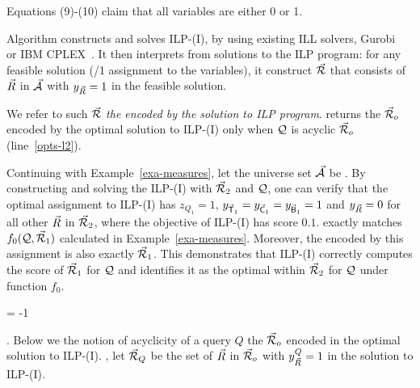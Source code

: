 \vspace{0.6ex}
Equations (9)-(10) claim that all variables are either 0 or 1.


\vspace{1.6ex}
Algorithm \opts constructs and solves ILP-(I), 
by using existing ILL solvers, \eg Gurobi~\cite{gurobi} or
IBM CPLEX~\cite{cplex}.
%
It then interprets \bdss from solutions to the ILP
program: for any feasible solution (/1 assignment to the
variables), it construct \bds $\vec{{\mathcal R}}$ that consists of \bss
$\vec{R}$ in $\vec{{\mathcal A}}$ with $y_{\vec{R}}  = 1$ in the feasible
solution.

We refer to such $\vec{{\mathcal R}}$ 
{\em the \bds encoded by the
solution to ILP program}. \opts returns the \bds
$\vec{{\mathcal R}}_{o}$ encoded by the optimal solution to ILP-(I) only
when $\mathcal Q$ is acyclic \wrt $\vec{{\mathcal R}}_{o}$ (line~\ref{opts-l2}).


\begin{example}\label{exa-ILP-I}
Continuing with Example~\ref{exa-measures},
let the universe set $\vec{{\mathcal A}}$ be .
By constructing and solving the ILP-(I) with $\vec{{\mathcal R}}_{2}$ and $\mathcal Q$,
one can verify that the optimal assignment to ILP-(I) has
$z_{Q_{1}} = 1$, $y_{\vec{\protect\mathsf{T}}_{1}} = y_{\vec{\protect\mathsf{C}}_{1}} =
y_{\vec{\protect\mathsf{B}}_{1}} = 1$ and $y_{\vec{R}} = 0$ for all other
$\vec{R}$ in $\vec{{\mathcal R}}_{2}$, where
the objective of ILP-(I) has score $0.1$.  %
exactly matches $f_{0}(\mathcal Q, \vec{{\mathcal R}}_{1})$ calculated in Example~\ref{exa-measures}.
Moreover, %
the encoded \bds by this assignment is also exactly
$\vec{{\mathcal R}}_{1}$. This demonstrates %
that ILP-(I) correctly computes the
score of $\vec{{\mathcal R}}_{1}$ for $\mathcal Q$ and identifies it as the optimal
\bds within $\vec{{\mathcal R}}_{2}$ for $\mathcal Q$ under function $f_{0}$. 
\end{example}
\looseness = -1


. Below we 
the notion
of acyclicity of a query $Q$ \wrt the \bds $\vec{{\mathcal R}}_{o}$ encoded
in the optimal solution to ILP-(I). , 
let $\vec{{\mathcal R}}_{Q}$ be the set
of \bss $\vec{R}$ in $\vec{{\mathcal R}}_{o}$ with $y_{\vec{R}}^{Q} = 1$ in
the solution to ILP-(I). %


